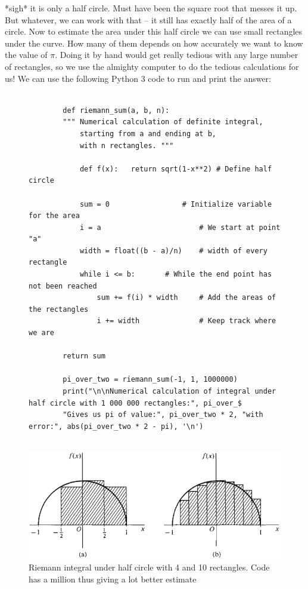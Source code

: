 \documentclass[pdftex, 12pt, a4paper]{report}
\begin{document}
	*sigh* it is only a half circle. Must have been the square root that messes it up. But whatever, we can work with that -- it still has exactly half of the area of a circle. Now to estimate the area under this half circle we can use small rectangles under the curve. How many of them depends on how accurately we want to know the value of $\pi$. Doing it by hand would get really tedious with any large number of rectangles, so we use the almighty computer to do the tedious calculations for us! We can use the following Python 3 code to run and print the answer: 
	\begin{figure}[H]
		\begin{lstlisting}
		
		def riemann_sum(a, b, n):
		"""	Numerical calculation of definite integral,
			starting from a and ending at b,
			with n rectangles. """
			
			def f(x):   return sqrt(1-x**2)	# Define half circle
			
			sum = 0					# Initialize variable for the area
			i = a						# We start at point "a"
			width = float((b - a)/n)	# width of every rectangle
			while i <= b:		# While the end point has not been reached
				sum += f(i) * width		# Add the areas of the rectangles
				i += width				# Keep track where we are
				
		return sum
		
		pi_over_two = riemann_sum(-1, 1, 1000000)
		print("\n\nNumerical calculation of integral under half circle with 1 000 000 rectangles:", pi_over_$
		"Gives us pi of value:", pi_over_two * 2, "with error:", abs(pi_over_two * 2 - pi), '\n')
		
		\end{lstlisting}
	\end{figure}
	
	\begin{figure}
		\centering
		\includegraphics[scale = 0.4]{riemann_int_circle}
		\caption{Riemann integral under half circle with 4 and 10 rectangles. Code has a million thus giving a lot better estimate}
	\end{figure}
	
\end{document}
